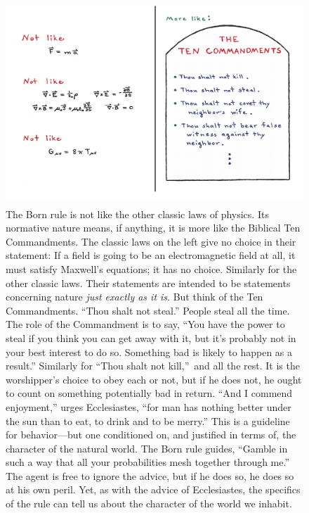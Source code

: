 \documentclass[aps,pra,superscriptaddress,12pt,tightenlines,nofootinbib]{revtex4-2}
\begin{document}
\begin{figure}
\begin{center}
\includegraphics[height=3in]{normativelawsupdate2}
\caption{ The Born rule is not like the other classic laws of physics.  Its normative nature means, if anything, it is more like the Biblical Ten Commandments.  The classic laws on the left give no choice in their statement: If a field is going to be an electromagnetic field at all, it must satisfy Maxwell's equations; it has no choice.  Similarly for the other classic laws.  Their statements are intended to be statements concerning nature {\it just exactly as it is}.  But think of the Ten Commandments.  ``Thou shalt not steal.''  People steal all the time.  The role of the Commandment is to say, ``You have the power to steal if you think you can get away with it, but it's probably not in your best interest to do so.  Something bad is likely to happen as a result.''  Similarly for ``Thou shalt not kill,''\ and all the rest.  It is the worshipper's choice to obey each or not, but if he does not, he ought to count on something potentially bad in return.  ``And I commend enjoyment,'' urges Ecclesiastes, ``for man has nothing better under the sun than to eat, to drink and to be merry.''  This is a guideline for behavior---but one conditioned on, and justified in terms of, the character of the natural world.  The Born rule guides, ``Gamble in such a way that all your probabilities mesh together through me.''  The agent is free to ignore the advice, but if he does so, he does so at his own peril.  Yet, as with the advice of Ecclesiastes, the specifics of the rule can tell us about the character of the world we inhabit.}
\end{center}
\end{figure}
\end{document}
